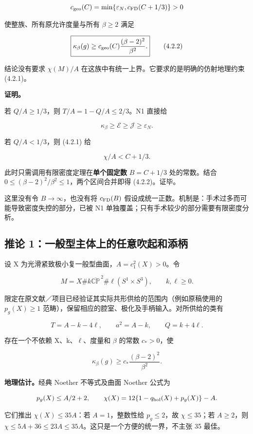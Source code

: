 \documentclass[UTF8,11pt,openany,fontset=none]{ctexbook}
\theoremstyle{definition}
\theoremstyle{remark}
\begin{document}
\[
c_{\rm geo}(C)=\min\{\varepsilon_N,c_{\rm FD}(C+1/3)\}>0
\]

使整族、所有原允许度量与所有 \(\beta\ge2\) 满足

\[
\boxed{\kappa_\beta(g)\ge
c_{\rm geo}(C)\frac{(\beta-2)^2}{\beta^2}.}
\tag{4.2.2}
\]

结论没有要求 \(\chi(M)/A\) 在这族中有统一上界。它要求的是明确的仿射地理约束 (4.2.1)。

\textbf{证明。}

若 \(Q/A\ge1/3\)，则 \(T/A=1-Q/A\le2/3\)。N1 直接给

\[
\kappa_\beta\ge\mathcal E\ge\mathcal J\ge\varepsilon_N.
\]

若 \(Q/A<1/3\)，则 (4.2.1) 给

\[
\chi/A<C+1/3.
\]

此时只需调用有限密度定理在\textbf{单个固定数} \(B=C+1/3\) 处的常数。结合 \(0\le(\beta-2)^2/\beta^2\le1\)，两个区间合并即得 (4.2.2)。证毕。

这里没有令 \(B\to\infty\)，也没有将 \(c_{\rm FD}(B)\) 假设成统一正数。机制是：手术过多而可能导致密度失控的部分，已被 N1 单独覆盖；只有手术较少的部分需要有限密度分析。

\subsection{推论 1：一般型主体上的任意吹起和添柄}\label{v4-ux63a8ux8bba-1ux4e00ux822cux578bux4e3bux4f53ux4e0aux7684ux4efbux610fux5439ux8d77ux548cux6dfbux67c4}

设 X 为光滑紧致极小复一般型曲面，\(A=c_1^2(X)>0\)。令

\[
M=X\#k\overline{\mathbb{CP}}^{\,2}
\#\ell(S^1\times S^3),\qquad k,\ell\ge0.
\]

限定在原文献／项目已经验证其实际共形供给的范围内（例如原稿使用的 \(p_g(X)\ge1\) 范畴），保留相应的腔室、极化及手柄输入。对所供给的类有

\[
T=A-k-4\ell,\qquad a^2=A-k,\qquad Q=k+4\ell.
\]

存在一个不依赖 X、k、\(\ell\)、度量和 \(\beta\) 的常数 \(c_*>0\)，使

\[
\boxed{\kappa_\beta(g)\ge
c_*\frac{(\beta-2)^2}{\beta^2}.}
\tag{4.2.3}
\]

\textbf{地理估计。}经典 Noether 不等式及曲面 Noether 公式为

\[
p_g(X)\le A/2+2,
\qquad
\chi(X)=12\{1-q_{\rm hol}(X)+p_g(X)\}-A.
\]

它们推出 \(\chi(X)\le35A\)：若 \(A=1\)，整数性给 \(p_g\le2\)，故 \(\chi\le35\)；若 \(A\ge2\)，则 \(\chi\le5A+36\le23A\le35A\)。这只是一个方便的统一界，不主张 35 最佳。
\end{document}

